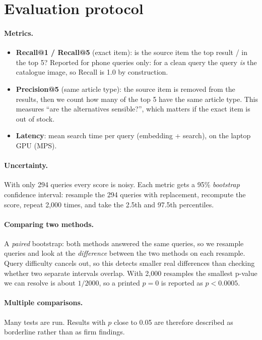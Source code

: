 \documentclass[11pt,a4paper]{article}
\begin{document}
\section{Evaluation protocol}

\paragraph{Metrics.}
\begin{itemize}
  \item \textbf{Recall@1 / Recall@5} (exact item): is the source item the top result / in the top 5?
        Reported for phone queries only: for a clean query the query \emph{is} the catalogue image,
        so Recall is 1.0 by construction.
  \item \textbf{Precision@5} (same article type): the source item is removed from the results, then we
        count how many of the top 5 have the same article type. This measures ``are the alternatives
        sensible?'', which matters if the exact item is out of stock.
  \item \textbf{Latency}: mean search time per query (embedding + search), on the laptop GPU (MPS).
\end{itemize}

\paragraph{Uncertainty.} With only 294 queries every score is noisy. Each metric gets a 95\%
\emph{bootstrap} confidence interval: resample the 294 queries with replacement, recompute the score,
repeat 2,000 times, and take the 2.5th and 97.5th percentiles.

\paragraph{Comparing two methods.} A \emph{paired} bootstrap: both methods answered the same queries,
so we resample queries and look at the \emph{difference} between the two methods on each resample.
Query difficulty cancels out, so this detects smaller real differences than checking whether two
separate intervals overlap. With 2,000 resamples the smallest p-value we can resolve is about
$1/2000$, so a printed $p=0$ is reported as $p<0.0005$.

\paragraph{Multiple comparisons.} Many tests are run. Results with $p$ close to 0.05 are therefore
described as borderline rather than as firm findings.
\end{document}
